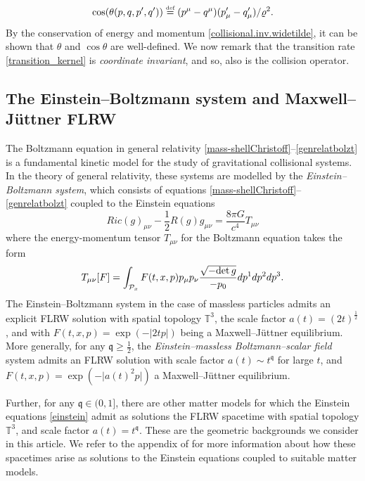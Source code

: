 \documentclass[reqno]{amsart}
\newcommand{\eqdef }{\overset{\mbox{\tiny{def}}}{=}}
\newcommand{\pv}{p}
\newcommand{\qv}{q}
\newcommand{\pM}{p^{\mu}}
\newcommand{\qM}{q^{\mu}}
\newcommand{\qq}{\mathfrak{q}}
\newcommand{\mrel}{\varrho}
\newcommand{\T}{\mathbb{T}}
\theoremstyle{definition}
\numberwithin{equation}{section}
\numberwithin{theorem}{section}
\begin{document}
\begin{equation}\notag 
\cos(\theta (p,q,p',q'))
\eqdef
(\pM - \qM) ({\pv}_\mu^\prime -{\qv}_\mu^\prime)/\mrel^2.
\end{equation}
By the conservation of energy and momentum \eqref{collisional.inv.widetilde}, it can be shown
that \(\theta\) and \(\cos \theta\) are well-defined.
We now remark that the transition rate \eqref{transition_kernel} is \emph{coordinate invariant}, and so, also is the collision operator. 






\subsection{The Einstein--Boltzmann system and Maxwell--J\"uttner FLRW }\label{subsecMJFLRW}



The Boltzmann equation in general relativity \eqref{mass-shellChristoff}--\eqref{genrelatbolzt} is a fundamental kinetic model for the study of gravitational collisional systems. In the theory of general relativity, these systems are modelled by the \emph{Einstein--Boltzmann system}, which consists of equations \eqref{mass-shellChristoff}--\eqref{genrelatbolzt} coupled to the Einstein equations 
\begin{equation}\label{einstein}
    Ric(g)_{\mu\nu}-\frac{1}{2}R(g)g_{\mu\nu}
    =
    \frac{8\pi G}{c^4} T_{\mu\nu}
\end{equation}
where the energy-momentum tensor \(T_{\mu\nu}\) for the Boltzmann equation takes the form 
\begin{equation}\notag
    T_{\mu\nu}[F]=\int_{\mathcal{P}_x}F(t,x,p)p_{\mu}p_{\nu}\frac{\sqrt{-\mathrm{det}\,g}}{-p_0}dp^1dp^2dp^3.
\end{equation}
The Einstein--Boltzmann system in the case of massless particles admits an explicit FLRW solution with spatial topology \(\mathbb{T}^3\), the scale factor \(a(t)=(2t)^{\frac{1}{2}}\), and with \(F(t,x,p)=\exp (-|2tp|)\) being a Maxwell--J\"uttner equilibrium.  More generally, for any $\qq \geq \frac{1}{2}$, the \emph{Einstein--massless Boltzmann--scalar field} system admits an FLRW solution with scale factor $a(t) \sim t^{\qq}$ for large $t$, and $F(t,x,p) = \exp(-\vert a(t)^2 p \vert)$ a Maxwell--J\"uttner equilibrium.

Further, for any \(\qq\in (0,1]\), there are other matter models for which the Einstein equations \eqref{einstein} admit as solutions the FLRW spacetime with spatial topology \(\T^3\), and scale factor \(a(t) = t^{\qq}\). These are the geometric backgrounds we consider in this article. We refer to the appendix of \cite{TaylorVelozo2025} for more information about how these spacetimes arise as solutions to the Einstein equations coupled to suitable matter models.
\end{document}
